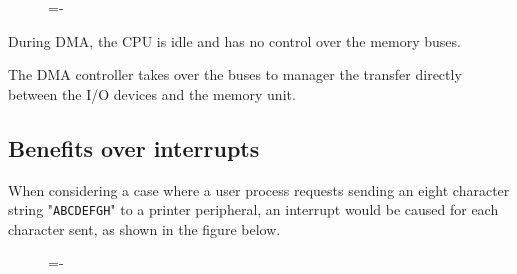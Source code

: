 \documentclass[a4paper]{systems-software}
\begin{document}
\begin{figure}[H]
  \lineskip=-\fboxrule
\end{figure}

During DMA, the CPU is idle and has no control over the memory buses.

The DMA controller takes over the buses to manager the transfer directly between the I/O devices and the memory unit.


\subsection*{Benefits over interrupts}

When considering a case where a user process requests sending an eight character string "\texttt{ABCDEFGH}" to a printer peripheral, an interrupt would be caused for each character sent, as shown in the figure below.

\begin{figure}[H]
  \lineskip=-\fboxrule
\end{figure}
\end{document}
